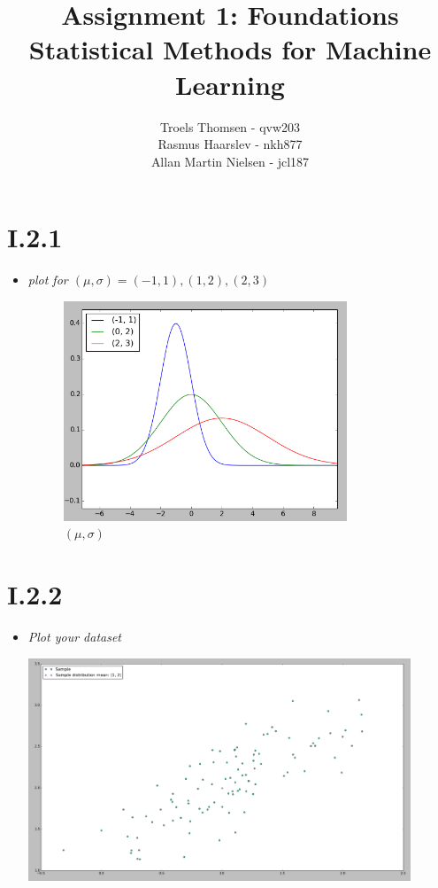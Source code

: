 \documentclass[12pt, a4paper]{article}
\title{Assignment 1: Foundations\\Statistical Methods for Machine Learning}
\author{Troels Thomsen - qvw203\\Rasmus Haarslev - nkh877\\Allan Martin Nielsen - jcl187}
\begin{document}
\pagestyle{empty}
\maketitle
\newpage

\tableofcontents
\newpage

\pagestyle{fancy}

\section{I.2.1}
\begin{itemize}
\item \textit{plot for $(\mu, \sigma) = {(-1, 1), (1, 2), (2, 3)}$}

\begin{figure}[!h]
    \centering
    \includegraphics[width=0.8\textwidth]{1.png}
    \caption{$(\mu, \sigma)$}
    \label{fig:awesome_image}
\end{figure}
\end{itemize}
\section{I.2.2}
\begin{itemize}
\item \textit{Plot your dataset}

\includegraphics[width=0.9\textwidth]{2.png}

\end{itemize}
\end{document}
